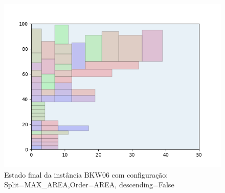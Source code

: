 \begin{figure}[H]
    \centering
    \caption[]{Estado final da instância BKW06 com configuração: Split=MAX_AREA,Order=AREA, descending=False}
    \label{fig:bkw06-max_area-area-false}
    \includegraphics[scale=0.5]{output/figures/bkw/bkw06/max_area/area/false/00}
\end{figure}